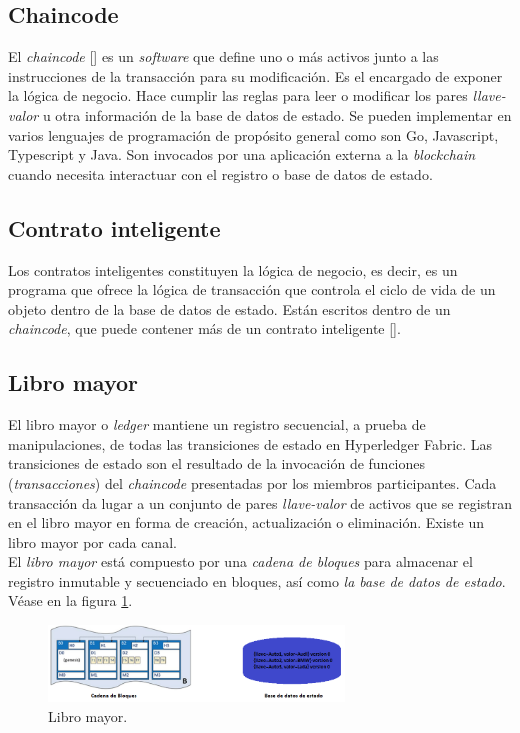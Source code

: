 \subsection{Chaincode}
El \emph{chaincode} [\cite{Chaincode}] es un \emph{software} que define uno o m\'as activos junto a las instrucciones de la transacci\'on para su modificaci\'on. Es el encargado de exponer la l\'ogica de negocio. Hace cumplir las reglas para leer o modificar los pares \emph{llave-valor} u otra informaci\'on de la base de datos de estado. Se pueden implementar en varios lenguajes de programaci\'on de prop\'osito general como son Go, Javascript, Typescript y Java. Son invocados por una aplicaci\'on externa a la \emph{blockchain} cuando necesita interactuar con el registro o base de datos de estado.

\subsection{Contrato inteligente}
Los contratos inteligentes constituyen la l\'ogica de negocio, es decir, es un programa que ofrece la l\'ogica de transacci\'on que controla el ciclo de vida de un objeto dentro de la base de datos de estado. Est\'an escritos dentro de un \emph{chaincode}, que puede contener m\'as de un contrato inteligente [\cite{SmartContract}].

\subsection{Libro mayor}
El libro mayor o \emph{ledger} mantiene un registro secuencial, a prueba de manipulaciones, de todas las transiciones de estado en Hyperledger Fabric. Las transiciones de estado son el resultado de la invocaci\'on de funciones (\emph{transacciones}) del \emph{chaincode} presentadas por los miembros participantes. Cada transacci\'on da lugar a un conjunto de pares \emph{llave-valor} de activos que se registran en el libro mayor en forma de creaci\'on, actualizaci\'on o eliminaci\'on. Existe un libro mayor por cada canal.\\

El \emph{libro mayor} est\'a compuesto por una \emph{cadena de bloques} para almacenar el registro inmutable y secuenciado en bloques, as\'i como \emph{la base de datos de estado}. V\'ease en la figura \ref{Libro mayor}.\\

\begin{figure}[h]
\centering
\includegraphics[width=0.7\textwidth]{Graphics/Ledger.png}
\caption{Libro mayor.}
\label{Libro mayor}
\end{figure}

